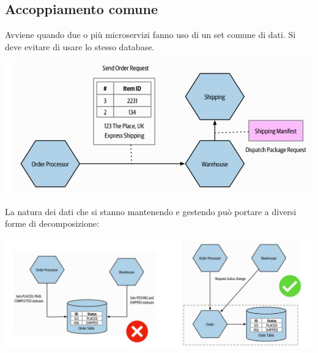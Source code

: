 \subsection{Accoppiamento comune}
Avviene quando due o più microservizi fanno uso di un set comune di dati. Si deve evitare di usare lo stesso database.
\begin{center}
    \includegraphics[scale = 0.4]{Images/SOA/ModelMicroservices4.jpg}
\end{center}
La natura dei dati che si stanno mantenendo e gestendo può portare a diversi forme di decomposizione:
\begin{center}
    \includegraphics[scale = 0.4]{Images/SOA/ModelMicroservices5.jpg}
\end{center}

